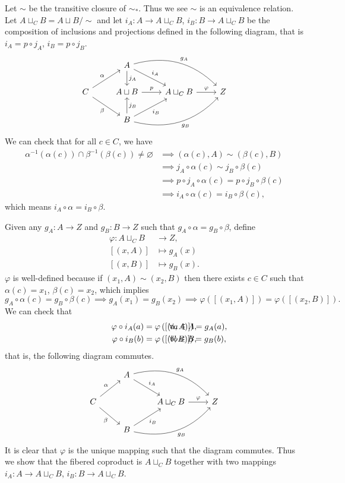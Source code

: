 \documentclass[12pt,letterpaper,boxed]{hmcpset}
\begin{document}
\begin{solution}
	Let $\sim$ be the transitive closure of $\sim_*$. Thus we see $\sim$ is an equivalence relation. Let $A\sqcup_C B =A\sqcup B/\sim$ and let $i_A:A\to A\sqcup_C B$, $i_B:B\to A\sqcup_C B $ be the composition of inclusions and projections defined in the following diagram, that is $i_A=p\circ j_A$, $i_B=p\circ j_B$. 
	\[\begin{tikzcd}
		& A\arrow[dr,"i_A"]\arrow[d,"j_A"]\arrow[drr,bend left,"g_A"]&&\\
		C\arrow[ur,"\alpha"]\arrow[dr,swap,"\beta"]&A\sqcup B\arrow[r,"p"]&A\sqcup_C B\arrow[r,"\varphi"]&Z \\
		& B\arrow[u,swap,"j_B"]\arrow[ur,swap,"i_B"]\arrow[urr,bend right,swap,"g_B"]&&
	\end{tikzcd}\]
	We can check that for all $c\in C$, we have
	\begin{align*}
	\alpha^{-1}(\alpha(c))\cap \beta^{-1}(\beta(c))\ne\varnothing &\implies (\alpha(c),A)\sim(\beta(c),B)\\
	&\implies j_A\circ\alpha(c)\sim j_B\circ\beta(c)\\
	&\implies p\circ j_A\circ\alpha(c)=p\circ j_B\circ\beta(c)\\
	&\implies i_A\circ\alpha(c)= i_B\circ\beta(c),
	\end{align*}
	which means $i_A\circ\alpha= i_B\circ\beta$.
	
	Given any $g_A:A\to Z$ and $g_B:B\to Z$ such that $ g_A\circ\alpha= g_B\circ\beta$, define
	\begin{align*}
		\varphi:A\sqcup_C B&\longrightarrow Z, \\  
		[(x,A)]&\longmapsto g_A(x)\\
		[(x,B)]&\longmapsto g_B(x).
	\end{align*}
	$\varphi$ is well-defined because if $(x_1,A)\sim (x_2,B)$ then there exists $c\in C$ such that $\alpha(c)=x_1$, $\beta(c)=x_2$, which implies
	\[
	g_A\circ\alpha(c)= g_B\circ\beta(c)\implies g_A(x_1)=g_B(x_2)\implies\varphi\left([(x_1,A)]\right)=\varphi\left([(x_2,B)]\right).
	\]
	We can check that
	\begin{align*}
	\varphi\circ i_A(a)&=\varphi\left([(a,A)]\right)=g_A(a),&\hspace{-8em}\forall a\in A,\\
	\varphi\circ i_B(b)&=\varphi\left([(b,B)]\right)=g_B(b),&\hspace{-8em}\forall b\in B,
	\end{align*}
	that is, the following diagram commutes.
	\[\begin{tikzcd}
	& A\arrow[dr,"i_A"]\arrow[drr,bend left,"g_A"]&&\\
	C\arrow[ur,"\alpha"]\arrow[dr,swap,"\beta"]&&A\sqcup_C B\arrow[r,"\varphi"]&Z \\
	& B\arrow[ur,swap,"i_B"]\arrow[urr,bend right,swap,"g_B"]&&
	\end{tikzcd}\]
	It is clear that $\varphi$ is the unique mapping such that the diagram commutes. Thus we show that the fibered coproduct is $A\sqcup_C B$ together with two mappings $i_A:A\to A\sqcup_C B$, $i_B:B\to A\sqcup_C B$.
	
\end{solution}
\end{document}
